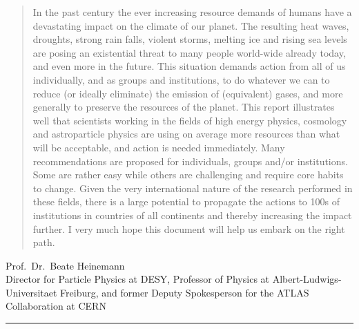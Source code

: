 \documentclass[../SustainableHEP.tex]{subfiles}
\begin{document}
\begin{quotation}
In the past century the ever increasing resource demands of humans have a devastating impact on the climate of our planet. The resulting heat waves, droughts, strong rain falls, violent storms, melting ice and rising sea levels are posing an existential threat to many people world-wide already today, and even more in the future. This situation demands action from all of us individually, and as groups and institutions, to do whatever we can to reduce (or ideally eliminate) the emission of \CdO  (equivalent) gases, and more generally to preserve the resources of the planet. This report illustrates well that scientists working in the fields of high energy physics, cosmology and astroparticle physics are using on average more resources than what will be acceptable, and action is needed immediately. Many recommendations are proposed for individuals, groups and/or institutions. Some are rather easy while others are challenging and require core habits to change. Given the very international nature of the research performed in these fields, there is a large potential to propagate the actions to 100s of institutions in countries of all continents and thereby increasing the impact further. I very much hope this document will help us embark on the right path.
\end{quotation}
\begin{flushleft}
Prof.~Dr.~Beate Heinemann\\
Director for Particle Physics at DESY, Professor of Physics at Albert-Ludwigs-Universitaet Freiburg, and former Deputy Spokesperson for the ATLAS Collaboration at CERN
\end{flushleft}

\textcolor{Pythongreen}{\rule{2cm}{3pt}}
\end{document}

